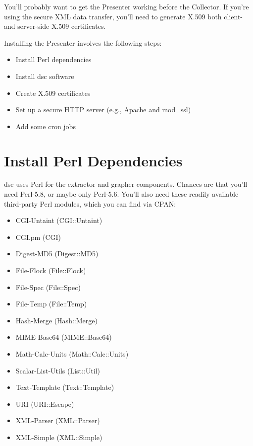 \documentclass{report}
\def\dsc{{\sc dsc}}
\begin{document}
You'll probably want to get the Presenter working before the Collector.
If you're using the secure XML data transfer, you'll need to
generate X.509 both client- and server-side X.509 certificates.

Installing the Presenter involves the following steps:
\begin{itemize}
\setlength{\itemsep}{0ex plus 0.5ex minus 0.0ex}
\item
	Install Perl dependencies
\item
	Install {\dsc} software
\item
	Create X.509 certificates
\item
	Set up a secure HTTP server (e.g., Apache and mod\_ssl)
\item
	Add some cron jobs
\end{itemize}


\section{Install Perl Dependencies}

{\dsc} uses Perl for the extractor and grapher components.  Chances are
that you'll need Perl-5.8, or maybe only Perl-5.6.  You'll also need
these readily available third-party Perl modules, which you
can find via CPAN:

\begin{itemize}
\setlength{\itemsep}{0ex plus 0.5ex minus 0.0ex}
	\item CGI-Untaint (CGI::Untaint)
	\item CGI.pm (CGI)
	\item Digest-MD5 (Digest::MD5)
	\item File-Flock (File::Flock)
	\item File-Spec (File::Spec)
	\item File-Temp (File::Temp)
	\item Hash-Merge (Hash::Merge)
	\item MIME-Base64 (MIME::Base64)
	\item Math-Calc-Units (Math::Calc::Units)
	\item Scalar-List-Utils (List::Util)
	\item Text-Template (Text::Template)
	\item URI (URI::Escape)
	\item XML-Parser (XML::Parser)
	\item XML-Simple (XML::Simple)

\end{itemize}
\end{document}
